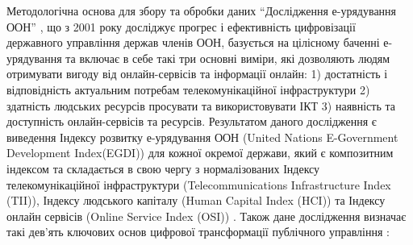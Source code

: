 Методологічна основа для збору та обробки даних \foreignquote{ukrainian}{Дослідження е-урядування ООН} \cite{book:un_e_govt_survey_2022}\cite{book:un_e_govt_survey_2020}, що з 2001 року досліджує прогрес і ефективність цифровізації державного управління держав членів ООН, базується на цілісному баченні е-урядування та включає в себе такі три основні виміри, які дозволяють людям отримувати вигоду від онлайн-сервісів та інформації онлайн: 1) достатність і відповідність актуальним потребам телекомунікаційної інфраструктури 2) здатність людських ресурсів просувати та використовувати ІКТ 3) наявність та доступність онлайн-сервісів та ресурсів. Результатом даного дослідження є виведення Індексу розвитку е-урядування ООН (United Nations E-Government Development Index(EGDI)) для кожної окремої держави, який є композитним індексом та складається в свою чергу з нормалізованих Індексу телекомунікаційної інфраструктури (Telecommunications Infrastructure Index (TII)), Індексу людського капіталу (Human Capital Index (HCI)) та Індексу онлайн сервісів (Online Service Index (OSI)) \cite[21]{book:un_e_govt_survey_2020}. Також дане дослідження визначає такі дев'ять ключових основ цифрової трансформації публічного управління \cite[22]{book:un_e_govt_survey_2020}: 

